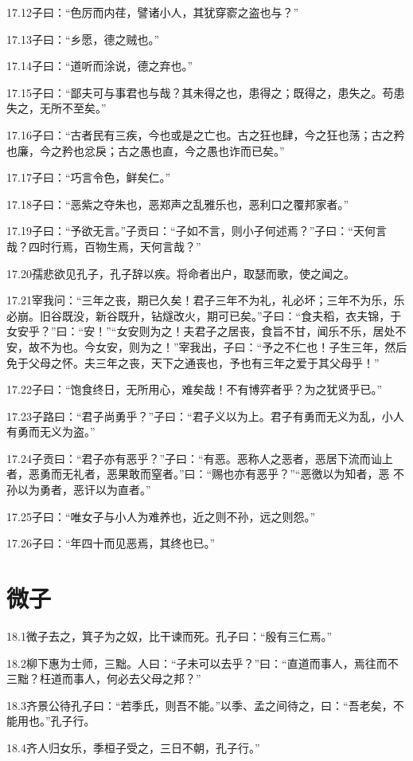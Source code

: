 \documentclass[a4paper,12pt,UTF8,twoside]{ctexbook}
\begin{document}
17.12子曰：“色厉而内荏，譬诸小人，其犹穿窬之盗也与？”

17.13子曰：“乡愿，德之贼也。”

17.14子曰：“道听而涂说，德之弃也。”

17.15子曰：“鄙夫可与事君也与哉？其未得之也，患得之；既得之，患失之。苟患失之，无所不至矣。”

17.16子曰：“古者民有三疾，今也或是之亡也。古之狂也肆，今之狂也荡；古之矜也廉，今之矜也忿戾；古之愚也直，今之愚也诈而已矣。”

17.17子曰：“巧言令色，鲜矣仁。”

17.18子曰：“恶紫之夺朱也，恶郑声之乱雅乐也，恶利口之覆邦家者。”

17.19子曰：“予欲无言。”子贡曰：“子如不言，则小子何述焉？”子曰：“天何言哉？四时行焉，百物生焉，天何言哉？”

17.20孺悲欲见孔子，孔子辞以疾。将命者出户，取瑟而歌，使之闻之。

17.21宰我问：“三年之丧，期已久矣！君子三年不为礼，礼必坏；三年不为乐，乐必崩。旧谷既没，新谷既升，钻燧改火，期可已矣。”子曰：“食夫稻，衣夫锦，于女安乎？”曰：“安！”“女安则为之！夫君子之居丧，食旨不甘，闻乐不乐，居处不安，故不为也。今女安，则为之！”宰我出，子曰：“予之不仁也！子生三年，然后免于父母之怀。夫三年之丧，天下之通丧也，予也有三年之爱于其父母乎！”

17.22子曰：“饱食终日，无所用心，难矣哉！不有博弈者乎？为之犹贤乎已。”

17.23子路曰：“君子尚勇乎？”子曰：“君子义以为上。君子有勇而无义为乱，小人有勇而无义为盗。”

17.24子贡曰：“君子亦有恶乎？”子曰：“有恶。恶称人之恶者，恶居下流而讪上者，恶勇而无礼者，恶果敢而窒者。”曰：“赐也亦有恶乎？”“恶徼以为知者，恶
不孙以为勇者，恶讦以为直者。”

17.25子曰：“唯女子与小人为难养也，近之则不孙，远之则怨。”

17.26子曰：“年四十而见恶焉，其终也已。”

\chapter{微子}
18.1微子去之，箕子为之奴，比干谏而死。孔子曰：“殷有三仁焉。”

18.2柳下惠为士师，三黜。人曰：“子未可以去乎？”曰：“直道而事人，焉往而不三黜？枉道而事人，何必去父母之邦？”

18.3齐景公待孔子曰：“若季氏，则吾不能。”以季、孟之间待之，曰：“吾老矣，不能用也。”孔子行。

18.4齐人归女乐，季桓子受之，三日不朝，孔子行。”
\end{document}
